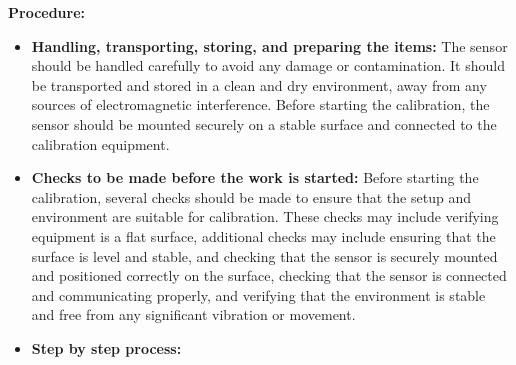 \textbf{Procedure:}

\begin{itemize}
\item \textbf{Handling, transporting, storing, and preparing the items: }\newline
The sensor should be handled carefully to avoid any damage or contamination. It should be transported and stored in a clean and dry environment, away from any sources of electromagnetic interference. Before starting the calibration, the sensor should be mounted securely on a stable surface and connected to the calibration equipment.

 \item \textbf{Checks to be made before the work is started: } \newline
Before starting the calibration, several checks should be made to ensure that the setup and environment are suitable for calibration. These checks may include verifying equipment is a flat surface, additional checks may include ensuring that the surface is level and stable, and checking that the sensor is securely mounted and positioned correctly on the surface, checking that the sensor is connected and communicating properly, and verifying that the environment is stable and free from any significant vibration or movement.

\item \textbf{Step by step process:}\newline
\begin{enumerate}


\end{enumerate}
\end{itemize}
